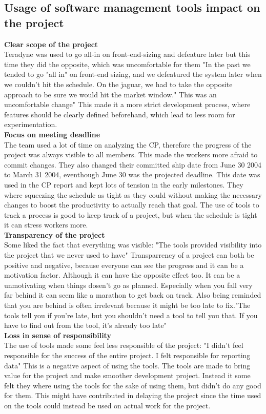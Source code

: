 \subsection{Usage of software management tools impact on the project}
\textbf {Clear scope of the project}
\\
Teradyne was used to go all-in on front-end-sizing and defeature later but this time they did the opposite, which was uncomfortable for them "In the past we tended to go "all in" on front-end sizing, and we defeatured the system later when we couldn't hit the schedule. On the jaguar, we had to take the opposite approach to be sure we would hit the market window." This was an uncomfortable change" \cite[p. 8, ]{GinoPisano2005} This made it a more strict development process, where features should be clearly defined beforehand, which lead to less room for experimentation.
\\
\textbf {Focus on meeting deadline}
\\
The team used a lot of time on analyzing the CP\cite[p. 8]{GinoPisano2005}, therefore the progress of the project was always visible to all members. This made the workers more afraid to commit changes. They also changed their committed ship date from June 30 2004 to March 31 2004, eventhough June 30 was the projected deadline. \cite[p. 12]{GinoPisano2005} This date was used in the CP report and kept lots of tension in the early milestones.
They where squeezing the schedule as tight as they could without making the necessary changes to boost the productivity to actually reach that goal. The use of tools to track a process is good to keep track of a project, but when the schedule is tight it can stress workers more. 
\\
\textbf {Transparency of the project}
\\
Some liked the fact that everything was visible: "The tools provided visibility into the project that we never used to have" \cite[p. 12]{GinoPisano2005}
Transparrency of a project can both be positive and negative, because everyone can see the progress and it can be a motivation factor. Although it can have the opposite effect too. It can be a unmotivating when things dosen't go as planned. Especially when you fall very far behind it can seem like a marathon to get back on track. Also being reminded that you are behind is often irrelevant because it might be too late to fix."The tools tell you if you're late, but you shouldn't need a tool to tell you that. If you have to find out from the tool, it's already too late" \cite[p. 12]{GinoPisano2005}
\\
\textbf {Loss in sense of responsibility}
\\
The use of tools made some feel less responsible of the project: "I didn't feel responsible for the success of the entire project. I felt responsible for reporting data" \cite[p. 12]{GinoPisano2005}
This is a negative aspect of using the tools. The tools are made to bring value for the project and make smoother development project. Instead it some felt they where using the tools for the sake of using them, but didn't do any good for them. This might have contributed in delaying the project since the time used on the tools could instead be used on actual work for the project.

